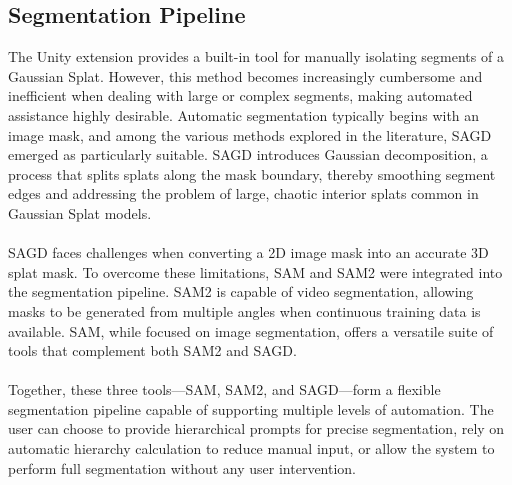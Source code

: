 \documentclass[twocolumn]{article}
\begin{document}
	
	\subsection{Segmentation Pipeline}
The Unity extension provides a built-in tool for manually isolating segments of a Gaussian Splat. However, this method becomes increasingly cumbersome and inefficient when dealing with large or complex segments, making automated assistance highly desirable. Automatic segmentation typically begins with an image mask, and among the various methods explored in the literature, SAGD \cite{SAGD} emerged as particularly suitable. SAGD introduces Gaussian decomposition, a process that splits splats along the mask boundary, thereby smoothing segment edges and addressing the problem of large, chaotic interior splats common in Gaussian Splat models.
\\\\
SAGD faces challenges when converting a 2D image mask into an accurate 3D splat mask. To overcome these limitations, SAM \cite{SAM} and SAM2 \cite{SAM2} were integrated into the segmentation pipeline. SAM2 is capable of video segmentation, allowing masks to be generated from multiple angles when continuous training data is available. SAM, while focused on image segmentation, offers a versatile suite of tools that complement both SAM2 and SAGD.
\\\\
Together, these three tools—SAM, SAM2, and SAGD—form a flexible segmentation pipeline capable of supporting multiple levels of automation. The user can choose to provide hierarchical prompts for precise segmentation, rely on automatic hierarchy calculation to reduce manual input, or allow the system to perform full segmentation without any user intervention.
	
\end{document}
